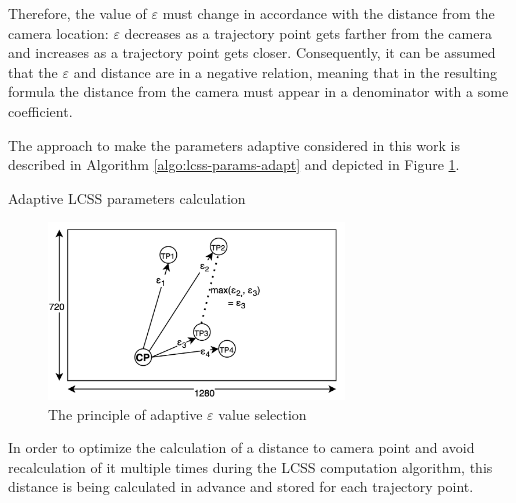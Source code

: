 Therefore, the value of $\varepsilon$ must change in accordance with the distance from the camera location: $\varepsilon$ decreases as a trajectory point gets farther from the camera and increases as a trajectory point gets closer. Consequently, it can be assumed that the $\varepsilon$ and distance are in a negative relation, meaning that in the resulting formula the distance from the camera must appear in a denominator with a some coefficient.

The approach to make the parameters adaptive considered in this work is described in Algorithm \ref{algo:lcss-params-adapt} and depicted in Figure \ref{fig:adaptivity}.

\begin{algorithm}[!htb]
	\caption{Adaptive LCSS parameters calculation}
	\label{algo:lcss-params-adapt}
	\SetAlgoLined
\end{algorithm}

\begin{figure}[!htb]
	\centering{}
	\includegraphics[width=0.7\textwidth]{images/adaptivity.png}
	\caption{The principle of adaptive $\varepsilon$ value selection}
	\label{fig:adaptivity}
\end{figure}

In order to optimize the calculation of a distance to camera point and avoid recalculation of it multiple times during the LCSS computation algorithm, this distance is being calculated in advance and stored for each trajectory point.

